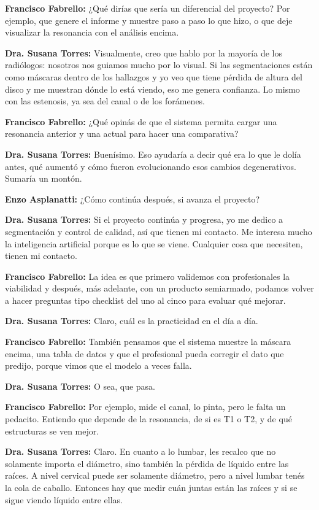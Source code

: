 \noindent\textbf{Francisco Fabrello:} ¿Qué dirías que sería un diferencial del proyecto? Por ejemplo, que genere el informe y muestre paso a paso lo que hizo, o que deje visualizar la resonancia con el análisis encima.

\noindent\textbf{Dra. Susana Torres:} Visualmente, creo que hablo por la mayoría de los radiólogos: nosotros nos guiamos mucho por lo visual. Si las segmentaciones están como máscaras dentro de los hallazgos y yo veo que tiene pérdida de altura del disco y me muestran dónde lo está viendo, eso me genera confianza. Lo mismo con las estenosis, ya sea del canal o de los forámenes.

\noindent\textbf{Francisco Fabrello:} ¿Qué opinás de que el sistema permita cargar una resonancia anterior y una actual para hacer una comparativa?

\noindent\textbf{Dra. Susana Torres:} Buenísimo. Eso ayudaría a decir qué era lo que le dolía antes, qué aumentó y cómo fueron evolucionando esos cambios degenerativos. Sumaría un montón.

\noindent\textbf{Enzo Asplanatti:} ¿Cómo continúa después, si avanza el proyecto?

\noindent\textbf{Dra. Susana Torres:} Si el proyecto continúa y progresa, yo me dedico a segmentación y control de calidad, así que tienen mi contacto. Me interesa mucho la inteligencia artificial porque es lo que se viene. Cualquier cosa que necesiten, tienen mi contacto.

\noindent\textbf{Francisco Fabrello:} La idea es que primero validemos con profesionales la viabilidad y después, más adelante, con un producto semiarmado, podamos volver a hacer preguntas tipo checklist del uno al cinco para evaluar qué mejorar.

\noindent\textbf{Dra. Susana Torres:} Claro, cuál es la practicidad en el día a día.

\noindent\textbf{Francisco Fabrello:} También pensamos que el sistema muestre la máscara encima, una tabla de datos y que el profesional pueda corregir el dato que predijo, porque vimos que el modelo a veces falla.

\noindent\textbf{Dra. Susana Torres:} O sea, que pasa.

\noindent\textbf{Francisco Fabrello:} Por ejemplo, mide el canal, lo pinta, pero le falta un pedacito. Entiendo que depende de la resonancia, de si es T1 o T2, y de qué estructuras se ven mejor.

\noindent\textbf{Dra. Susana Torres:} Claro. En cuanto a lo lumbar, les recalco que no solamente importa el diámetro, sino también la pérdida de líquido entre las raíces. A nivel cervical puede ser solamente diámetro, pero a nivel lumbar tenés la cola de caballo. Entonces hay que medir cuán juntas están las raíces y si se sigue viendo líquido entre ellas.

